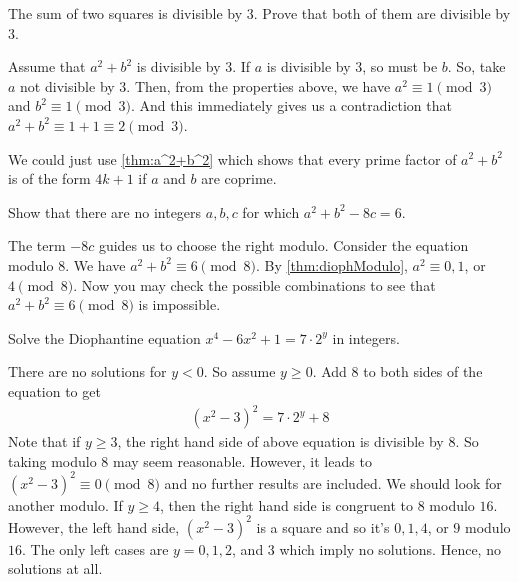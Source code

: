 		\begin{problem}
			The sum of two squares is divisible by $3$. Prove that both of them are divisible by $3$.
		\end{problem}

		\begin{solution}
			Assume that $a^2+b^2$ is divisible by $3$. If $a$ is divisible by $3$, so must be $b$. So, take $a$ not divisible by $3$. Then, from the properties above, we have $a^2\equiv1\pmod3$ and $b^2\equiv1\pmod3$. And this immediately gives us a contradiction that $a^2+b^2\equiv1+1\equiv2\pmod3$.
		\end{solution}

		\begin{remark}
			We could just use \autoref{thm:a^2+b^2} which shows that every prime factor of $a^2+b^2$ is of the form $4k+1$ if $a$ and $b$ are coprime.
		\end{remark}

		\begin{problem}
			Show that there are no integers $a,b,c$ for which $a^2+b^2-8c=6$.
		\end{problem}

		\begin{solution}
			The term $-8c$ guides us to choose the right modulo. Consider the equation modulo $8$. We have $a^2+b^2\equiv 6\pmod{8}$. By \autoref{thm:diophModulo}, $a^2\equiv 0, 1$, or  $4\pmod{8}$. Now you may check the possible combinations to see that $a^2+b^2\equiv 6\pmod{8}$ is impossible.
		\end{solution}

		\begin{problem}
			Solve the Diophantine equation $x^4-6x^2+1=7 \cdot 2^y$ in integers.
		\end{problem}

		\begin{solution}
			There are no solutions for $y<0$. So assume $y\geq 0$. Add $8$ to both sides of the equation to get
				\begin{align*}
			 (x^2-3)^2=7\cdot 2^y+8
				\end{align*}
			Note that if $y \geq 3$, the right hand side of above equation is divisible by $8$. So taking modulo $8$ may seem reasonable. However, it leads to $(x^2-3)^2 \equiv 0 \pmod 8$ and no further results are included. We should look for another modulo. If $y \geq 4$, then the right hand side is congruent to $8$ modulo $16$. However, the left hand side, $(x^2-3)^2$ is a square and so it's $0, 1, 4$, or $9$ modulo $16$. The only left cases are $y=0,1,2$, and $3$ which imply no solutions. Hence, no solutions at all.
		\end{solution}


